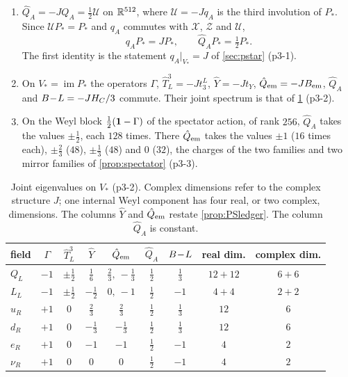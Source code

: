 \begin{proposition}
\label{p3:prop:charges}
\begin{enumerate}[label=(\roman*),leftmargin=2.2em]
\item $\hat Q_A=-JQ_A=\tfrac12\mathcal U$ on $\mathbb{R}^{512}$, where $\mathcal U=-Jq_A$ is the third involution of $P_*$. Since $\mathcal UP_*=P_*$ and $q_A$ commutes with $\mathcal X$, $\mathcal Z$ and $\mathcal U$,
\[
q_AP_*=JP_*,\qquad \hat Q_AP_*=\tfrac12P_* .
\]
The first identity is the statement $q_A|_{V_*}=J$ of \cref{sec:pstar} (p3-1).
\item On $V_*=\operatorname{im}P_*$ the operators $\Gamma$, $\hat T^3_L=-Jt^L_3$, $\hat Y=-Jt_Y$, $\hat Q_{\rm em}=-JB_{\rm em}$, $\hat Q_A$ and $B\!-\!L=-JH_C/3$ commute. Their
joint spectrum is that of \cref{p3:tab:charges} (p3-2).
\item On the Weyl block $\tfrac12(\mathbf 1-\Gamma)$ of the spectator action, of rank $256$, $\hat Q_A$ takes the values $\pm\tfrac12$, each $128$ times. There
$\hat Q_{\rm em}$ takes the values $\pm1$ ($16$ times each), $\pm\tfrac23$ ($48$), $\pm\tfrac13$ ($48$) and $0$ ($32$), the charges of the two families and two mirror
families of \cref{prop:spectator} (p3-3).
\end{enumerate}
\end{proposition}

\begin{table}[t]
\centering
\small
\begin{tabular}{@{}lcccccccc@{}}
\toprule
field & $\Gamma$ & $\hat T^3_L$ & $\hat Y$ & $\hat Q_{\rm em}$ & $\hat Q_A$ & $B\!-\!L$ & real dim. & complex dim.\\
\midrule
$Q_L$ & $-1$ & $\pm\tfrac12$ & $\tfrac16$ & $\tfrac23,\ -\tfrac13$ & $\tfrac12$ & $\tfrac13$ & $12+12$ & $6+6$\\
$L_L$ & $-1$ & $\pm\tfrac12$ & $-\tfrac12$ & $0,\ -1$ & $\tfrac12$ & $-1$ & $4+4$ & $2+2$\\
$u_R$ & $+1$ & $0$ & $\tfrac23$ & $\tfrac23$ & $\tfrac12$ & $\tfrac13$ & $12$ & $6$\\
$d_R$ & $+1$ & $0$ & $-\tfrac13$ & $-\tfrac13$ & $\tfrac12$ & $\tfrac13$ & $12$ & $6$\\
$e_R$ & $+1$ & $0$ & $-1$ & $-1$ & $\tfrac12$ & $-1$ & $4$ & $2$\\
$\nu_R$ & $+1$ & $0$ & $0$ & $0$ & $\tfrac12$ & $-1$ & $4$ & $2$\\
\bottomrule
\end{tabular}
\caption{Joint eigenvalues on $V_*$ (p3-2). Complex dimensions refer to the complex structure $J$; one internal Weyl component has four real, or two complex,
dimensions. The columns $\hat Y$ and $\hat Q_{\rm em}$ restate \cref{prop:PSledger}. The column $\hat Q_A$ is constant.}
\label{p3:tab:charges}
\end{table}

